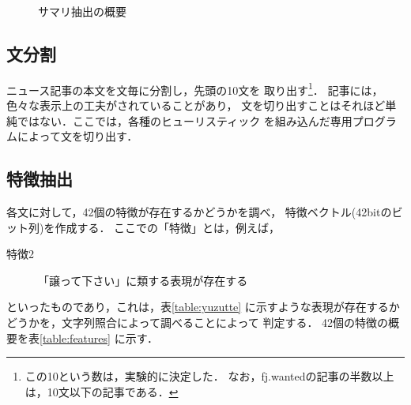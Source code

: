 \begin{figure} 
\begin{center} \small
{}
\end{center}
\caption{サマリ抽出の概要}
\label{fig:summary_extraction}
\end{figure}

\subsection{文分割}
ニュース記事の本文を文毎に分割し，先頭の10文を
取り出す\footnote{この10という数は，実験的に決定した．
なお，fj.wantedの記事の半数以上は，10文以下の記事である．}．
記事には，色々な表示上の工夫がされていることがあり，
文を切り出すことはそれほど単純ではない．ここでは，各種のヒューリスティック
を組み込んだ専用プログラムによって文を切り出す．

\subsection{特徴抽出}

各文に対して，42個の特徴が存在するかどうかを調べ，
特徴ベクトル(42bitのビット列)を作成する．
ここでの「特徴」とは，例えば，
\begin{description}
\item[特徴2] 「譲って下さい」に類する表現が存在する
\end{description}
といったものであり，これは，表\ref{table:yuzutte}
に示すような表現が存在するかどうかを，文字列照合によって調べることによって
判定する．
42個の特徴の概要を表\ref{table:features} に示す．

